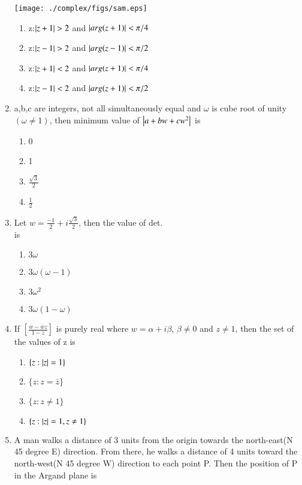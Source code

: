 \begin{enumerate}[label=\arabic*.,ref=\thesubsection.\theenumi]
        \texttt{[image: ./complex/figs/sam.eps]}
    \begin{enumerate}
    \item  z:$\left\vert z+1 \right\vert > 2$ and $\left\vert arg(z+1)\right\vert < \pi/4$
    \item   z:$\left\vert z-1\right\vert > 2$ and $\left\vert arg(z-1)\right\vert < \pi/2$
    \item   z:$\left\vert z+1\right\vert < 2$ and $\left\vert arg(z+1)\right\vert < \pi/4$
    \item   z:$\left\vert z-1\right\vert < 2$ and $\left\vert arg(z+1) \right\vert < \pi/2$
    \end{enumerate}
    \item a,b,c are integers, not all simultaneously equal and $\omega$ is cube root of unity $(\omega \neq 1)$, then minimum value of $\left\vert a+bw+cw^2\right\vert $ is
    \begin{enumerate}
    \item   0
    \item   1
    \item   $\frac{\sqrt3}{2}$
    \item   $\frac{1}{2}$
    \end{enumerate}
    \item Let $w = \frac{-1}{2} + i\frac{\sqrt3}{2}$, then the value of det.
    \\  is 
    \begin{enumerate}
    \item   $3\omega$
    \item   $3\omega(\omega-1)$
    \item   $3\omega^2$
    \item  $3\omega(1-\omega)$ 
    \end{enumerate}
    \item If $[\frac{w-\bar w z}{1-z}]$ is purely real where $w = \alpha+i\beta$, $\beta \neq 0$ and $z \neq 1$, then the set of the values of z is 
    \begin{enumerate}
    \item   $\{z:\left\vert z\right\vert =1\}$
    \item   $\{z:z=\bar z\}$
    \item   $\{z:z\neq1\}$
    \item   $\{z:\left\vert z\right\vert=1,z \neq 1\}$
    \end{enumerate}    
    \item A man walks a distance of 3 units from the origin towards the north-east(N 45 degree E) direction. From there, he walks a distance of 4 units toward the north-west(N 45 degree W) direction to each point P. Then the position of P in the Argand plane is

\end{enumerate}
